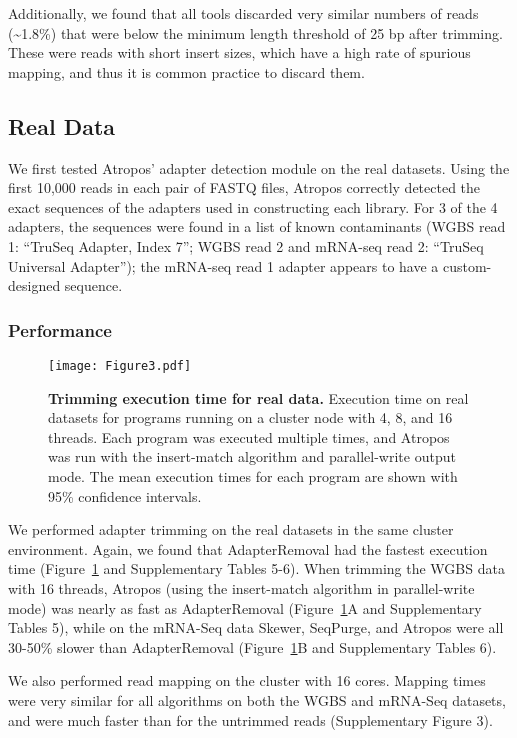 \documentclass[fleqn,10pt,lineno]{wlpeerj} %
\begin{document}
Additionally, we found that all tools discarded very similar numbers of reads (\textasciitilde{}1.8\%) that were below the minimum length threshold of 25 bp after trimming. These were reads with short insert sizes, which have a high rate of spurious mapping, and thus it is common practice to discard them. 

\subsection{Real Data}

We first tested Atropos' adapter detection module on the real datasets. Using the first 10,000 reads in each pair of FASTQ files, Atropos correctly detected the exact sequences of the adapters used in constructing each library. For 3 of the 4 adapters, the sequences were found in a list of known contaminants (WGBS read 1: ``TruSeq Adapter, Index 7''; WGBS read 2 and mRNA-seq read 2: ``TruSeq Universal Adapter''); the mRNA-seq read 1 adapter appears to have a custom-designed sequence.

\subsubsection{Performance}

\begin{figure}[!ht]
\centering
\texttt{[image: Figure3.pdf]}
\caption{\textbf{Trimming execution time for real data.} Execution time on real datasets for programs running on a cluster node with 4, 8, and 16 threads. Each program was executed multiple times, and Atropos was run with the insert-match algorithm and parallel-write output mode. The mean execution times for each program are shown with 95\% confidence intervals.}
\label{fig:real-performance}
\end{figure}

We performed adapter trimming on the real datasets in the same cluster environment. Again, we found that AdapterRemoval had the fastest execution time (Figure~\ref{fig:real-performance} and Supplementary Tables 5-6). When trimming the WGBS data with 16 threads, Atropos (using the insert-match algorithm in parallel-write mode) was nearly as fast as AdapterRemoval (Figure~\ref{fig:real-performance}A and Supplementary Tables 5), while on the mRNA-Seq data Skewer, SeqPurge, and Atropos were all 30-50\% slower than AdapterRemoval (Figure~\ref{fig:real-performance}B and Supplementary Tables 6).

We also performed read mapping on the cluster with 16 cores. Mapping times were very similar for all algorithms on both the WGBS and mRNA-Seq datasets, and were much faster than for the untrimmed reads (Supplementary Figure 3).
\end{document}
